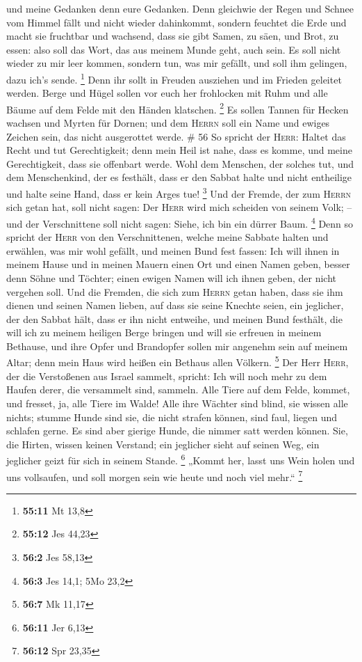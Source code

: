 und meine Gedanken denn eure Gedanken.  Denn gleichwie
der Regen und Schnee vom Himmel fällt und nicht wieder dahinkommt,
sondern feuchtet die Erde und macht sie fruchtbar und wachsend, dass sie
gibt Samen, zu säen, und Brot, zu essen:  also soll das
Wort, das aus meinem Munde geht, auch sein. Es soll nicht wieder zu mir
leer kommen, sondern tun, was mir gefällt, und soll ihm gelingen, dazu
ich's sende. \footnote{\textbf{55:11} Mt 13,8}  Denn ihr
sollt in Freuden ausziehen und im Frieden geleitet werden. Berge und
Hügel sollen vor euch her frohlocken mit Ruhm und alle Bäume auf dem
Felde mit den Händen klatschen. \footnote{\textbf{55:12} Jes 44,23}
 Es sollen Tannen für Hecken wachsen und Myrten für
Dornen; und dem \textsc{Herrn} soll ein Name und ewiges Zeichen sein,
das nicht ausgerottet werde. \# 56  So spricht der
\textsc{Herr}: Haltet das Recht und tut Gerechtigkeit; denn mein Heil
ist nahe, dass es komme, und meine Gerechtigkeit, dass sie offenbart
werde.  Wohl dem Menschen, der solches tut, und dem
Menschenkind, der es festhält, dass er den Sabbat halte und nicht
entheilige und halte seine Hand, dass er kein Arges tue! \footnote{\textbf{56:2}
  Jes 58,13}  Und der Fremde, der zum \textsc{Herrn} sich
getan hat, soll nicht sagen: Der \textsc{Herr} wird mich scheiden von
seinem Volk; -- und der Verschnittene soll nicht sagen: Siehe, ich bin
ein dürrer Baum. \footnote{\textbf{56:3} Jes 14,1; 5Mo 23,2}
 Denn so spricht der \textsc{Herr} von den Verschnittenen,
welche meine Sabbate halten und erwählen, was mir wohl gefällt, und
meinen Bund fest fassen:  Ich will ihnen in meinem Hause
und in meinen Mauern einen Ort und einen Namen geben, besser denn Söhne
und Töchter; einen ewigen Namen will ich ihnen geben, der nicht vergehen
soll.  Und die Fremden, die sich zum \textsc{Herrn} getan
haben, dass sie ihm dienen und seinen Namen lieben, auf dass sie seine
Knechte seien, ein jeglicher, der den Sabbat hält, dass er ihn nicht
entweihe, und meinen Bund festhält,  die will ich zu
meinem heiligen Berge bringen und will sie erfreuen in meinem Bethause,
und ihre Opfer und Brandopfer sollen mir angenehm sein auf meinem Altar;
denn mein Haus wird heißen ein Bethaus allen Völkern. \footnote{\textbf{56:7}
  Mk 11,17}  Der Herr \textsc{Herr}, der die Verstoßenen
aus Israel sammelt, spricht: Ich will noch mehr zu dem Haufen derer, die
versammelt sind, sammeln.  Alle Tiere auf dem Felde,
kommet, und fresset, ja, alle Tiere im Walde!  Alle ihre
Wächter sind blind, sie wissen alle nichts; stumme Hunde sind sie, die
nicht strafen können, sind faul, liegen und schlafen gerne.
 Es sind aber gierige Hunde, die nimmer satt werden
können. Sie, die Hirten, wissen keinen Verstand; ein jeglicher sieht auf
seinen Weg, ein jeglicher geizt für sich in seinem Stande. \footnote{\textbf{56:11}
  Jer 6,13}  „Kommt her, lasst uns Wein holen und uns
vollsaufen, und soll morgen sein wie heute und noch viel mehr.``
\footnote{\textbf{56:12} Spr 23,35}


